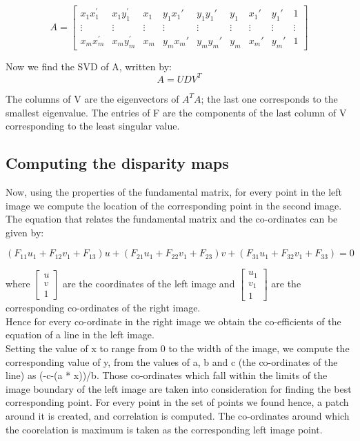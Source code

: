 \documentclass[letterpaper,11pt]{article}
\begin{document}
\[
A = \begin{bmatrix} x_{1}x_{1}^{'} & x_{1}y_{1}^{'} & x_{1} & y_{1}x_{1}' & y_{1}y_{1}' & y_{1} & x_{1}' & y_{1}'& 1  \\ \vdots & \vdots & \vdots &\vdots &\vdots & \vdots & \vdots & \vdots &\vdots\\ x_{m}x_{m}^{'} & x_{m}y_{m}^{'} & x_{m} & y_{m}x_{m}' & y_{m}y_{m}' & y_{m} & x_{m}' & y_{m}'& 1 \end{bmatrix}
\]

Now we find the SVD of A, written by:
\[
A = UDV^{T}
\]

The columns of V are the eigenvectors of $A^{T}A$; the last one corresponds to the smallest eigenvalue. The entries of F are the components of the last column of V corresponding to the least singular value.

\subsection{Computing the disparity maps}

Now, using the properties of the fundamental matrix, for every point in the left image we compute the location of the corresponding point in the second image. The equation that relates the fundamental matrix and the co-ordinates can be given by:

\[
(F_{11}u_{1} + F_{12}v_{1} + F_{13})u + (F_{21}u_{1} + F_{22}v_{1} + F_{23})v + (F_{31}u_{1} + F_{32}v_{1} + F_{33}) = 0
\]

where $\begin{bmatrix} u \\ v \\ 1 \end{bmatrix}$ are the coordinates of the left image and $\begin{bmatrix} u_{1} \\ v_{1} \\ 1 \end{bmatrix}$ are the corresponding co-ordinates of the right image. \\
Hence for every co-ordinate in the right image we obtain the co-efficients of the equation of a line in the left image. \\

Setting the value of x to range from 0 to the width of the image, we compute the corresponding value of y, from the values of a, b and c (the co-ordinates of the line) as (-c-(a * x))/b. Those co-ordinates which fall within the limits of the image boundary of the left image are taken into consideration for finding the best corresponding point. For every point in the set of points we found hence, a patch around it is created, and correlation is computed. The co-ordinates around which the coorelation is maximum is taken as the corresponding left image point. \\
\end{document}
